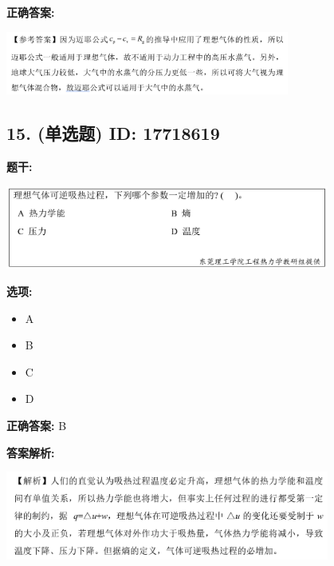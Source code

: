 \documentclass[12pt]{article}
\begin{document}
\textbf{正确答案:}

\begin{center}\includegraphics[width=0.7\textwidth, height=0.2\textheight, keepaspectratio]{question_14_17718609/correct_answer_1_img_1.png}\end{center}

\vspace{0.5em}\hrulefill\vspace{1em}

\subsection*{15. (单选题) \small ID: 17718619}

\textbf{题干:}


\begin{center}\includegraphics[width=0.8\textwidth, height=0.25\textheight, keepaspectratio]{question_15_17718619/title_img_1.png}\end{center}

\textbf{选项:}
\begin{itemize}[leftmargin=*]
  \item A

  \item B

  \item C

  \item D

\end{itemize}

\textbf{正确答案:}
B

\textbf{答案解析:}


\begin{center}\includegraphics[width=0.8\textwidth, height=0.25\textheight, keepaspectratio]{question_15_17718619/correct_replay_img_1.png}\end{center}
\end{document}
